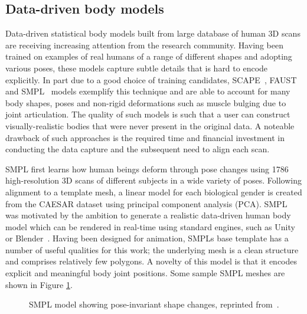 \subsection{Data-driven body models}
Data-driven statistical body models built from large database of human 3D scans are receiving increasing attention from the research community. Having been trained on examples of real humans of a range of different shapes and adopting various poses, these models capture subtle details that is hard to encode explicitly. In part due to a good choice of training candidates, SCAPE~\cite{anguelov05scape}, FAUST~\cite{bogo2014faust} and SMPL~\cite{loper15smpl} models exemplify this technique and are able to account for many body shapes, poses and non-rigid deformations such as muscle bulging due to joint articulation. The quality of such models is such that a user can construct visually-realistic bodies that were never present in the original data. A noteable drawback of such approaches is the required time and financial investment in conducting the data capture and the subsequent need to align each scan.

SMPL first learns how human beings deform through pose changes using 1786 high-resolution 3D scans of different subjects in a wide variety of poses. Following alignment to a template mesh, a linear model for each biological gender is created from the CAESAR dataset \cite{robinette2002civilian} using principal component analysis (PCA). SMPL was motivated by the ambition to generate a realistic data-driven human body model which can be rendered in real-time using standard engines, such as Unity~\cite{unity2017} or Blender~\cite{blender2017}. Having been designed for animation, SMPLs base template has a number of useful qualities for this work; the underlying mesh is a clean structure and comprises relatively few polygons. A novelty of this model is that it encodes explicit and meaningful body joint positions. Some sample SMPL meshes are shown in Figure \ref{fig:smpl_model}.

\begin{figure}[H] %
    \caption{SMPL model showing pose-invariant shape changes, reprinted from~\cite{loper15smpl}.}
    \label{fig:smpl_model}
\end{figure}

